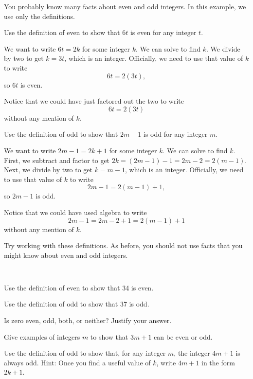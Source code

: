 \begin{exam}
\label{exam_even_odd_general} 
You probably know many facts about even and odd integers.  In this example, we use only the definitions. 
    \begin{apart}
        \item Use the definition of even to show that $6t$ is even for any integer $t$.
            \begin{soln}
                We want to write $6t=2k$ for some integer $k$.  We can solve to find $k$. We divide by two to get $k=3t$, which is an integer. Officially, we need to use that value of $k$ to write $$6t=2(3t),$$ so $6t$ is even. 
                
                Notice that we could have just factored out the two to write $$6t=2(3t)$$ without any mention of $k$.
            \end{soln}
        \item Use the definition of odd to show that $2m-1$ is odd for any integer $m$.
            \begin{soln}
                We want to write $2m-1 = 2k+1$ for some integer $k$.  We can solve to find $k$.  First, we subtract and factor to get $2k=(2m-1)-1=2m-2=2(m-1)$. Next, we divide by two to get $k=m-1$, which is an integer. Officially, we need to use that value of $k$ to write $$2m-1= 2(m-1)+1,$$ so $2m-1$ is odd.

                Notice that we could have used algebra to write $$2m-1 = 2m-2+1 = 2(m-1) + 1$$ without any mention of $k$.
            \end{soln}
    \end{apart}
\end{exam}

Try working with these definitions.  As before, you should not use facts that you might know about even and odd integers.

\begin{act}
\label{act_even_odd}
~ 
    \begin{actpart}
        \item Use the definition of even to show that 34 is even.
        \item Use the definition of odd to show that 37 is odd. 
        \item \label{part_0is_even} Is zero even, odd, both, or neither? Justify your answer.
        \item Give examples of integers $m$ to show that $3m+1$ can be even or odd.  
        \item Use the definition of odd to show that, for any integer $m$, the integer $4m+1$ is always odd.  Hint: Once you find a useful value of $k$, write $4m+1$ in the form $2k+1$.
    \end{actpart}  
\end{act}

